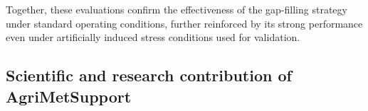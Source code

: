 \documentclass[authoryear,preprint,review,12pt]{elsarticle}
\begin{document}
Together, these evaluations confirm the effectiveness of the gap-filling strategy under standard operating conditions, further reinforced by its strong performance even under artificially induced stress conditions used for validation.

\subsection{Scientific and research contribution of Agri\-Met\-Support}\label{sec:Valuability}
    
\end{document}

